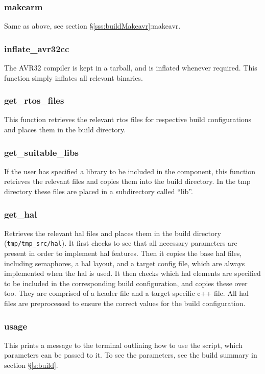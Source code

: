 \documentclass[a4paper, oneside, 11pt, titlepage, onecolumn, openright]{report}
\begin{document}
\subsubsection{makearm}
			\label{sss:buildMakearm}
			Same as above, see section \S\ref{sss:buildMakeavr}:makeavr.
			
\subsubsection{inflate\_avr32cc}
			\label{sss:buildInflateavr32cc}
			The AVR32 compiler is kept in a tarball, and is inflated whenever required. This function simply inflates all relevant binaries.
			
\subsubsection{get\_rtos\_files}
			\label{sss:buildGetrtosfiles}
			This function retrieves the relevant rtos files for respective build configurations and places them in the build directory.
			
\subsubsection{get\_suitable\_libs}
			\label{sss:buildGetsuitablelibs}
			If the user has specified a library to be included in the component, this function retrieves the relevant files and copies them into the build directory. In the tmp directory these files are placed in a subdirectory called ``lib''.
			
\subsubsection{get\_hal}
			\label{sss:buildGethal}
			Retrieves the relevant hal files and places them in the build directory (\texttt{tmp/tmp\_src/hal}). It first checks to see that all necessary parameters are present in order to implement hal features. Then it copies the base hal files, including semaphores, a hal layout, and a target config file, which are always implemented when the hal is used. \newline
			It then checks which hal elements are specified to be included in the corresponding build configuration, and copies these over too. They are comprised of a header file and a target specific c++ file. All hal files are preprocessed to ensure the correct values for the build configuration.
			
\subsubsection{usage}
			\label{sss:buildUsage}
			This prints a message to the terminal outlining how to use the script, which parameters can be passed to it. To see the parameters, see the build summary in section \S\ref{s:build}. 
\end{document}
